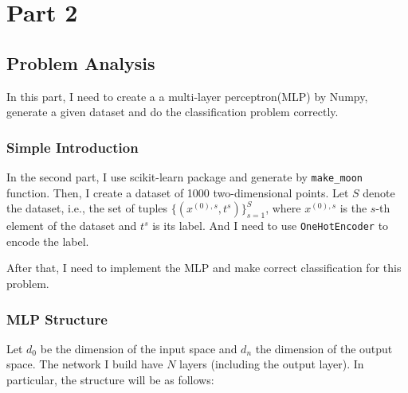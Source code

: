 \section{Part 2}


\subsection{Problem Analysis}

In this part, I need to create a a multi-layer perceptron(MLP) by Numpy, generate a given dataset and do the classification problem correctly.

\subsubsection{Simple Introduction}

In the second part, I use scikit-learn package and generate by \texttt{make\_moon} function.
Then, I create a dataset of 1000 two-dimensional points. Let $S$ denote the dataset, i.e., the set of tuples $\{(x^{(0),s}, t^{s})\}_{s=1}^{S}$, where $x^{(0),s}$ is the $s$-th element of the dataset and $t^{s}$ is its label.
And I need to use \texttt{OneHotEncoder} to encode the label.

After that, I need to implement the MLP and make correct classification for this problem.

\subsubsection{MLP Structure}

Let $d_{0}$ be the dimension of the input space and $d_{n}$ the dimension of the output space.
The network I build have $N$ layers (including the output layer).
In particular, the structure will be as follows:

